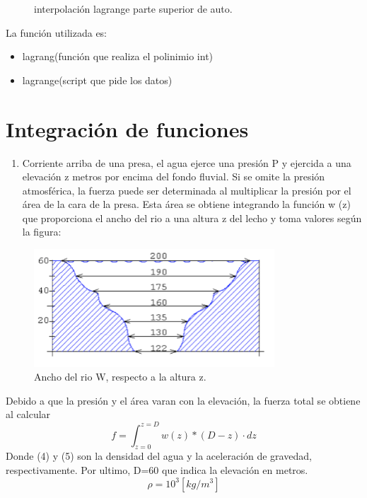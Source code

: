 \documentclass{udpreport}
\begin{document}
\begin{enumerate}
\begin{figure}[H]
    \caption{interpolación lagrange parte superior de auto.} \label{fig:int_lagrange_aprox_parte_sup}
\end{figure}
La función utilizada es:
 
\begin{itemize}
\item lagrang(función que realiza el polinimio int)
\item lagrange(script que pide los datos)
\end{itemize}

\newpage


  
 \chapter{Integración de funciones} 

 
\begin{enumerate}
\item Corriente arriba de una presa, el agua ejerce una presión  P  y ejercida a una elevación z metros por encima del fondo fluvial. Si se omite la presión atmosférica, la fuerza puede ser determinada al multiplicar la presión por el  área de la cara de la presa. Esta área se obtiene integrando la función w (z) que proporciona el ancho del rio a una altura z del lecho y toma valores según la figura:
\end{enumerate}

 
 \begin{figure}[H]
    \centering
    \includegraphics[width=9cm]{enunciado2}
    \caption{Ancho del rio W, respecto a la altura z.} \label{fig:enunciado2}
\end{figure}
Debido a que la presión y el área varan con la elevación, la fuerza total se obtiene al calcular
 \begin{equation}
 f=\int_{z=0}^{z=D} w(z)*(D-z) \cdot dz
\end{equation}
Donde (4) y (5) son la densidad del agua y la aceleración de gravedad, respectivamente. Por ultimo, D=60 que indica la elevación en metros.
\begin{equation}
 \rho=10^3[kg/m^3] 
\end{equation}
 

\end{enumerate}
\end{document}

